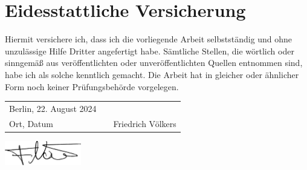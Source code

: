\documentclass[a4paper,12pt]{report}
\numberwithin{equation}{chapter}
\begin{document}
\appendix
\clearpage
{}
\setcounter{page}{7}

% 
% 

\printbibliography

\clearpage


\begin{minipage}{\textwidth}
    \printglossary[type=main,title=Glossar]
    \vspace{7em} %
    \printglossary[type=\acronymtype,title=Abkürzungsverzeichnis]
\end{minipage}



\clearpage
\chapter*{Eidesstattliche Versicherung}
Hiermit versichere ich, dass ich die vorliegende Arbeit selbstständig und ohne unzulässige Hilfe Dritter angefertigt habe. Sämtliche Stellen, die wörtlich oder sinngemäß aus veröffentlichten oder unveröffentlichten Quellen entnommen sind, habe ich als solche kenntlich gemacht. Die Arbeit hat in gleicher oder ähnlicher Form noch keiner Prüfungsbehörde vorgelegen.

\vspace{3cm}

\begin{table}[h]
    \begin{tabularx}{\textwidth}{p{5cm}X p{5cm}}
        Berlin, 22. August 2024           &  &                                 \\\cline{1-1} \cline{3-3}
        \vspace{0.1em}Ort, Datum &  & \vspace{0.1em}Friedrich Völkers
    \end{tabularx}
\end{table}


\vspace{-3.3cm}
\begin{center}
    \hspace{11cm}\includegraphics[width=0.25\textwidth]{images/signature.png} %
\end{center}
\end{document}
